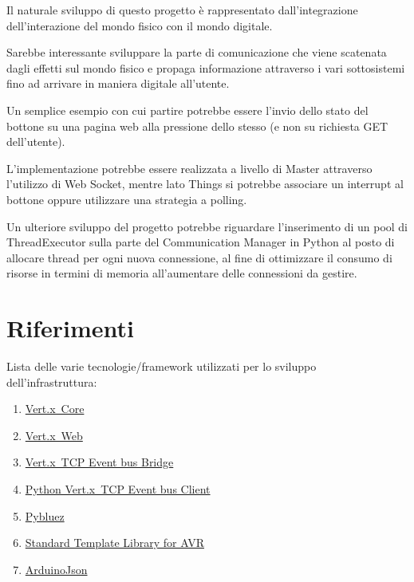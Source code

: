 \documentclass[11pt,a4paper]{article}
\newcommand{\vertx}{Vert.x}
\begin{document}
Il naturale sviluppo di questo progetto \`e rappresentato dall'integrazione dell'interazione del mondo fisico con il mondo digitale.

Sarebbe interessante sviluppare la parte di comunicazione che viene scatenata dagli effetti sul mondo fisico e propaga informazione attraverso i vari sottosistemi fino ad arrivare in maniera digitale all'utente.

Un semplice esempio con cui partire potrebbe essere l'invio dello stato del bottone su una pagina web alla pressione dello stesso (e non su richiesta GET dell'utente).

L'implementazione potrebbe essere realizzata a livello di Master attraverso l'utilizzo di Web Socket, mentre lato Things si potrebbe associare un interrupt al bottone oppure utilizzare una strategia a polling.

Un ulteriore sviluppo del progetto potrebbe riguardare l'inserimento di un pool di ThreadExecutor sulla parte del Communication Manager in Python al posto di allocare thread per ogni nuova connessione, al fine di ottimizzare il consumo di risorse in termini di memoria all'aumentare delle connessioni da gestire.

\section{Riferimenti}

Lista delle varie tecnologie/framework utilizzati per lo sviluppo dell'infrastruttura:
\begin{enumerate}

\item \href{http://vertx.io/docs/vertx-core/java}{\vertx \, Core}

\item \href{http://vertx.io/docs/vertx-web/java}{\vertx \, Web}

\item \href{http://vertx.io/docs/vertx-tcp-eventbus-bridge/java}{\vertx \, TCP Event bus Bridge}

\item \href{http://jaymine.github.io/TCP-eventbus-client-Python/}{Python \vertx \, TCP Event bus Client}

\item \href{http://karulis.github.io/pybluez/}{Pybluez}

\item \href{http://andybrown.me.uk/2011/01/15/the-standard-template-library-stl-for-avr-with-c-streams/}{Standard Template Library for AVR}

\item \href{https://bblanchon.github.io/ArduinoJson}{ArduinoJson}

\end{enumerate}
\end{document}
